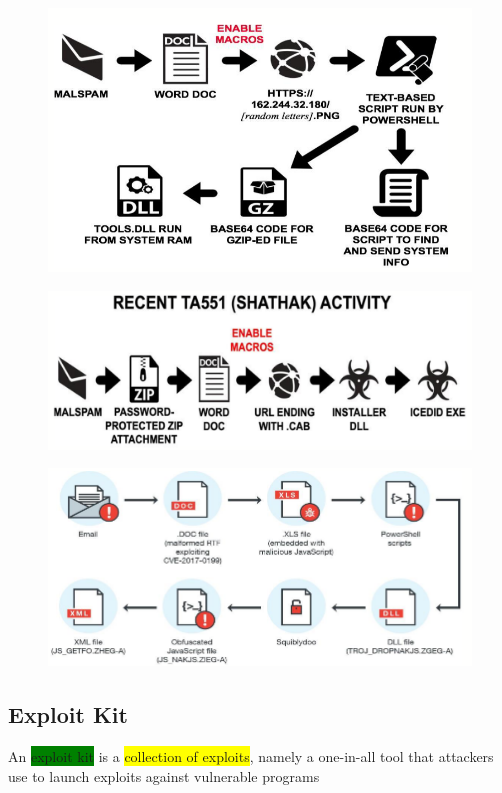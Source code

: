 \documentclass[]{project_plan}
\begin{document}
\begin{figure}[H]
  \centering
  \includegraphics[width=\linewidth]{web vuln example 4.png}
\end{figure}
\begin{figure}[H]
  \centering
  \includegraphics[width=\linewidth]{web vuln example 5.png}
\end{figure}
\begin{figure}[H]
  \centering
  \includegraphics[width=\linewidth]{web vuln example 6.png}
\end{figure}

\subsection{Exploit Kit}
An \colorbox{green}{exploit kit} is a \colorbox{yellow}{collection of exploits}, namely a one-in-all tool that attackers
use to launch exploits against vulnerable programs
\end{document}
